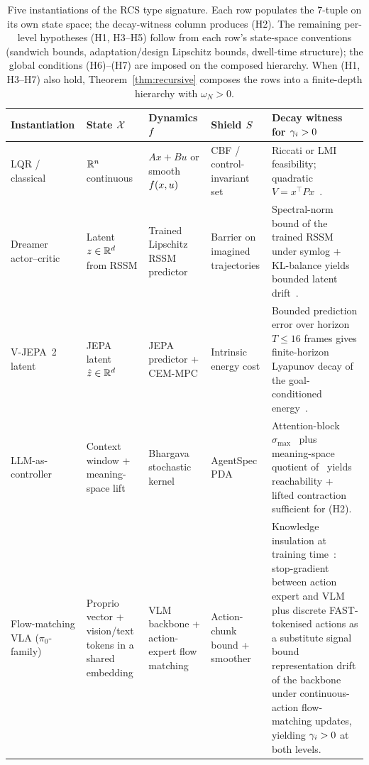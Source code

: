 \documentclass[11pt,a4paper]{article}
\begin{document}
\begin{table}[h]
\centering
\small
\setlength{\tabcolsep}{4pt}
\begin{tabular}{@{}p{2.4cm}p{2.6cm}p{2.6cm}p{2.6cm}p{4.4cm}@{}}
\toprule
\textbf{Instantiation} & \textbf{State $\mathcal{X}$} & \textbf{Dynamics $f$}
  & \textbf{Shield $S$} & \textbf{Decay witness for $\gamma_i > 0$}\\
\midrule
LQR / classical
  & $\mathbb{R}^n$ continuous
  & $Ax + Bu$ or smooth $f(x,u)$
  & CBF / control-invariant set~\cite{ames2019cbf}
  & Riccati or LMI feasibility; quadratic $V = x^\top Px$~\cite{khalil2002nonlinear}.\\
\addlinespace
Dreamer actor--critic
  & Latent $z \in \mathbb{R}^d$ from RSSM
  & Trained Lipschitz RSSM predictor
  & Barrier on imagined trajectories
  & Spectral-norm bound of the trained RSSM under symlog + KL-balance yields bounded latent drift~\cite{hafner2025dreamerv3}.\\
\addlinespace
V-JEPA~2 latent
  & JEPA latent $\hat z \in \mathbb{R}^d$
  & JEPA predictor + CEM-MPC
  & Intrinsic energy cost
  & Bounded prediction error over horizon $T \leq 16$ frames gives finite-horizon Lyapunov decay of the goal-conditioned energy~\cite{assran2025vjepa2}.\\
\addlinespace
LLM-as-controller
  & Context window + meaning-space lift
  & Bhargava stochastic kernel
  & AgentSpec PDA~\cite{wang2026agentspec}
  & Attention-block $\sigma_{\max}$~\cite{bhargava2023magic} plus meaning-space quotient of~\cite{soatto2023taming} yields reachability + lifted contraction sufficient for (H2).\\
\addlinespace
Flow-matching VLA ($\pi_0$-family)
  & Proprio vector + vision/text tokens in a shared embedding
  & VLM backbone + action-expert flow matching~\cite{black2024pi0}
  & Action-chunk bound + smoother
  & Knowledge insulation at training time~\cite{driess2025ki}: stop-gradient between action expert and VLM plus discrete FAST-tokenised actions as a substitute signal bound representation drift of the backbone under continuous-action flow-matching updates, yielding $\gamma_i > 0$ at both levels.\\
\bottomrule
\end{tabular}
\caption{Five instantiations of the RCS type signature.  Each row
populates the 7-tuple on its own state space; the decay-witness column
produces (H2).  The remaining per-level hypotheses (H1, H3--H5) follow
from each row's state-space conventions (sandwich bounds,
adaptation/design Lipschitz bounds, dwell-time structure); the global
conditions (H6)--(H7) are imposed on the composed hierarchy.  When (H1,
H3--H7) also hold, Theorem~\ref{thm:recursive} composes the rows into a
finite-depth hierarchy with $\omega_N > 0$.}
\label{tab:instantiations}
\end{table}
\end{document}
